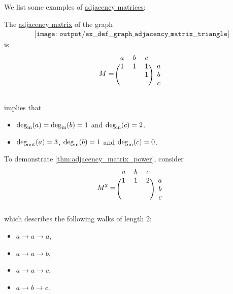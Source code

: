 \begin{example}\label{ex:def:graph_adjacency_matrix}
  We list some examples of \hyperref[def:graph_adjacency_matrix]{adjacency matrices}:
  \begin{thmenum}
     The \hyperref[def:graph_adjacency_matrix]{adjacency matrix} of the graph
    \begin{equation}\label{eq:ex:def:graph_adjacency_matrix/triangle/graph}
      \begin{aligned}
        \texttt{[image: output/ex\_\_def\_\_graph\_adjacency\_matrix\_\_triangle]}
      \end{aligned}
    \end{equation}
    is
    \begin{equation}\label{eq:ex:def:graph_adjacency_matrix/triangle/graph/matrix}
      M =
      \begin{blockarray}{*{3}{c} c}
        a & b & c &   \\
      \begin{block}{(*{3}{c}) c}
        1 & 1 & 1 & a \\
          &   & 1 & b \\
          &   &   & c \\
      \end{block}
      \end{blockarray}
    \end{equation}

     implies that
    \begin{itemize}
      \item \( \deg_{\op{in}}(a) = \deg_{\op{in}}(b) = 1 \) and \( \deg_{\op{in}}(c) = 2 \).
      \item \( \deg_{\op{out}}(a) = 3 \), \( \deg_{\op{in}}(b) = 1 \) and \( \deg_{\op{in}}(c) = 0 \).
    \end{itemize}

    To demonstrate \cref{thm:adjacency_matrix_power}, consider
    \begin{equation*}
      M^2 =
      \begin{blockarray}{*{3}{c} c}
        a & b & c &   \\
      \begin{block}{(*{3}{c}) c}
        1 & 1 & 2 & a \\
          &   &   & b \\
          &   &   & c \\
      \end{block}
      \end{blockarray}
    \end{equation*}
    which describes the following walks of length \( 2 \):
    \begin{itemize}
      \item \( a \to a \to a \),
      \item \( a \to a \to b \),
      \item \( a \to a \to c \),
      \item \( a \to b \to c \).
    \end{itemize}


\end{thmenum}
\end{example}
